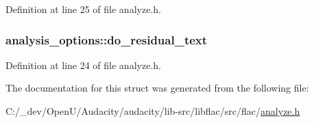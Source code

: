 Definition at line 25 of file analyze.\+h.

\subsubsection[{\texorpdfstring{do\+\_\+residual\+\_\+text}{do_residual_text}}]{ analysis\+\_\+options\+::do\+\_\+residual\+\_\+text}\hypertarget{structanalysis__options_abc70e0a062f8f24f407826a40bcbbf33}{}\label{structanalysis__options_abc70e0a062f8f24f407826a40bcbbf33}


Definition at line 24 of file analyze.\+h.



The documentation for this struct was generated from the following file\+:\begin{DoxyCompactItemize}
\item 
C\+:/\+\_\+dev/\+Open\+U/\+Audacity/audacity/lib-\/src/libflac/src/flac/\hyperlink{analyze_8h}{analyze.\+h}\end{DoxyCompactItemize}
